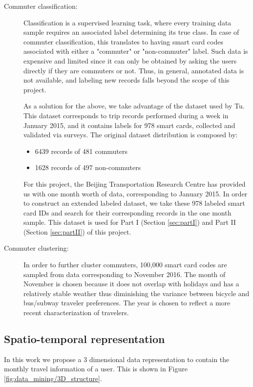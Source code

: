 \documentclass{article}
\begin{document}
\begin{description}%
\item[Commuter classification:]
Classification is a supervised learning task, where every training data sample requires an associated label determining its true class. In case of commuter classification, this translates to having smart card codes associated with either a "commuter" or "non-commuter" label. Such data is expensive and limited since it can only be obtained by asking the users directly if they are commuters or not. Thus, in general, annotated data is not available, and labeling new records falls beyond the scope of this project. 

As a solution for the above, we take advantage of the dataset used by Tu\cite{tu2016impact}. This dataset corresponds to trip records performed during a week in January 2015, and it contains labels for 978 smart cards, collected and validated via surveys. The original dataset distribution is composed by:

\begin{itemize}
\item 6439 records of 481 commuters
\item 1628 records of 497 non-commuters
\end{itemize}

For this project, the Beijing Transportation Research Centre has provided us with one month worth of data, corresponding to January 2015. In order to construct an extended labeled dataset, we take these 978 labeled smart card IDs and search for their corresponding records in the one month sample. This dataset is used for Part I (Section \ref{sec:partI}) and Part II (Section \ref{sec:partII}) of this project. 

\item[Commuter clustering:]
In order to further cluster commuters, 100,000 smart card codes are sampled from data corresponding to November 2016. The month of November is chosen because it does not overlap with holidays and has a relatively stable weather thus diminishing the variance between bicycle and bus/subway traveler preferences. The year is chosen to reflect a more recent characterization of travelers. 

\end{description}



\subsection{Spatio-temporal representation}
In this work we propose a 3 dimensional data representation to contain the monthly travel information of a user. This is shown in Figure \ref{fig:data_mining/3D_structure}.
\end{document}
